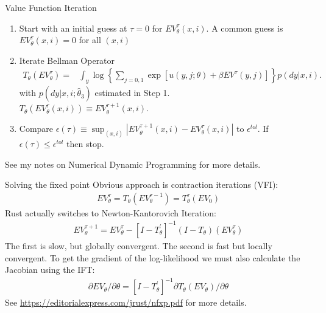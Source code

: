 \documentclass[xcolor=pdftex,dvipsnames,table,mathserif,aspectratio=169]{beamer}
\begin{document}
\begin{frame}{Value Function Iteration}
\footnotesize
\begin{enumerate}
\item Start with an initial guess at $\tau=0$ for $EV^{\tau}_{\theta}(x,i)$. A common guess is $EV_{\theta}^{\tau}(x,i) = 0$ for all $(x,i)$
\item Iterate Bellman Operator
\begin{align*}
T_{\theta}\left(EV_{\theta}^{\tau}\right)= & \int_y \log  \left \{ \sum_{j=0,1} \exp [ u(y, j ; \theta)  + \beta EV^{\tau}(y,j)] \right \} p(dy|x,i).
\end{align*}
with $p(dy | x, i; \hat \theta_3)$ estimated in Step 1.\\

$T_{\theta}\left(EV_{\theta}^{\tau}(x,i)\right)\equiv EV_{\theta}^{\tau+1}(x,i)$.\\
\item Compare $\epsilon(\tau) \equiv \sup_{(x,i)} | EV_{\theta}^{\tau+1}(x,i) - EV_{\theta}^{\tau}(x,i)|$ to $\epsilon^{tol}$. If $\epsilon(\tau) \leq \epsilon^{tol}$ then stop.
\end{enumerate}
See my notes on Numerical Dynamic Programming for more details.
\end{frame}

\begin{frame}{Solving the fixed point}
Obvious approach is contraction iterations (VFI):
\begin{align*}
E V_{\theta}^{\tau}=T_{\theta}\left(E V_{\theta}^{\tau-1}\right)=T_{\theta}^{\tau}\left(E V_{0}\right)
\end{align*}
Rust actually switches to Newton-Kantorovich Iteration:
\begin{align*}
E V_{\theta}^{\tau+1}=E V_{\theta}^{\tau}-\left[I-T_{\theta}^{\prime}\right]^{-1}\left(I-T_{\theta}\right)\left(E V_{\theta}^{\tau}\right)
\end{align*}
The first is slow, but globally convergent. The second is fast but locally convergent. To get the gradient of the log-likelihood we must also calculate the Jacobian using the IFT:
\begin{align*}
\partial E V_{\theta} / \partial \theta=\left[I-T_{\theta}^{\prime}\right]^{-1} \partial T_{\theta}\left(E V_{\theta}\right) / \partial \theta
\end{align*}
See \url{https://editorialexpress.com/jrust/nfxp.pdf} for more details.
\end{frame}
\end{document}
